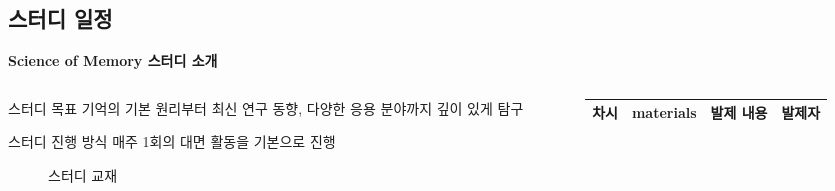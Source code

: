 \documentclass{beamer}
\begin{document}
\subsection{스터디 일정}
\begin{frame}{\textbf{Science of Memory 스터디 소개}}
  \begin{columns}
    \begin{column}{0.39\textwidth}
      \begin{block}{스터디 목표}
        기억의 기본 원리부터 최신 연구 동향, 다양한 응용 분야까지 깊이 있게 탐구
      \end{block}
      \begin{block}{스터디 진행 방식}
        매주 1회의 대면 활동을 기본으로 진행
      \end{block}
      \vspace{-1em}
      \begin{figure}
        \centering
        \qquad
        \vspace{-0.5em}
        \caption{스터디 교재}
      \end{figure}
    \end{column}
    \hfill
    \begin{column}{0.6\textwidth}
      \begin{table}[]
        \centering
        \scriptsize
        \begin{tabularx}{\textwidth}{|c|p{1cm}|X|l|}
      \hline
      \textbf{차시}        & \textbf{materials}                                            & \textbf{발제 내용}                                                        & \textbf{발제자} \\ \hline

\end{tabularx}
\end{table}
\end{column}
\end{columns}
\end{frame}
\end{document}

